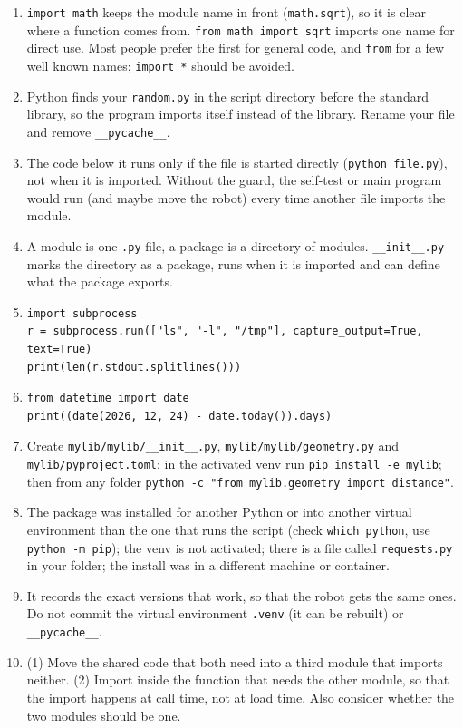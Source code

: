 \begin{enumerate}[label=\textbf{\ansnum.\arabic*}]
  \item \verb!import math! keeps the module name in front (\texttt{math.sqrt}), so it is clear where a function comes from. \verb!from math import sqrt! imports one name for direct use. Most people prefer the first for general code, and \texttt{from} for a few well known names; \texttt{import *} should be avoided.
  \item Python finds your \texttt{random.py} in the script directory before the standard library, so the program imports itself instead of the library. Rename your file and remove \texttt{\_\_pycache\_\_}.
  \item The code below it runs only if the file is started directly (\verb!python file.py!), not when it is imported. Without the guard, the self-test or main program would run (and maybe move the robot) every time another file imports the module.
  \item A module is one \texttt{.py} file, a package is a directory of modules. \texttt{\_\_init\_\_.py} marks the directory as a package, runs when it is imported and can define what the package exports.
  \item
\begin{verbatim}
import subprocess
r = subprocess.run(["ls", "-l", "/tmp"], capture_output=True, text=True)
print(len(r.stdout.splitlines()))
\end{verbatim}
  \item
\begin{verbatim}
from datetime import date
print((date(2026, 12, 24) - date.today()).days)
\end{verbatim}
  \item Create \texttt{mylib/mylib/\_\_init\_\_.py}, \texttt{mylib/mylib/geometry.py} and \texttt{mylib/pyproject.toml}; in the activated venv run \verb!pip install -e mylib!; then from any folder \verb!python -c "from mylib.geometry import distance"!.
  \item The package was installed for another Python or into another virtual environment than the one that runs the script (check \verb!which python!, use \verb!python -m pip!); the venv is not activated; there is a file called \texttt{requests.py} in your folder; the install was in a different machine or container.
  \item It records the exact versions that work, so that the robot gets the same ones. Do not commit the virtual environment \texttt{.venv} (it can be rebuilt) or \texttt{\_\_pycache\_\_}.
  \item[\textbf{\ansnum.10}] (1) Move the shared code that both need into a third module that imports neither. (2) Import inside the function that needs the other module, so that the import happens at call time, not at load time. Also consider whether the two modules should be one.
\end{enumerate}
